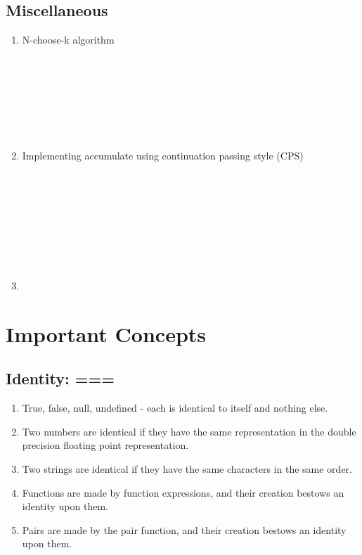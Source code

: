 \documentclass[11pt]{article}
\theoremstyle{definition}
\begin{document}
\subsection{Miscellaneous}
\begin{enumerate}
    \item N-choose-k algorithm
    \begin{shaded} 
    {\code
         \\
         \\
         \\
         \\
         \\
         \\
        \text{ \} } 
        }
        \end{shaded}
    \item Implementing accumulate using continuation passing style (CPS)
    \begin{shaded} 
    {\code
         \\
         \\
         \\
         \\
         \\
        \text{\qquad \} } \\
         \\
        \text{ \} } 
        }
        \end{shaded}
    \item 
\end{enumerate}
\section{Important Concepts}
\subsection{Identity: ===}
\begin{enumerate}
\item {\color{red}True, false, null, undefined} - each is identical to itself and nothing else.
\item Two {\color{red}numbers} are identical if they have the same representation in the double precision floating point representation.
\item Two {\color{red}strings} are identical if they have the same characters in the same order.
\item {\color{red}Functions} are made by function expressions, and their creation bestows an identity upon them. 
\item {\color{red} Pairs} are made by the pair function, and their creation bestows an identity upon them.
\end{enumerate}
\end{document}
